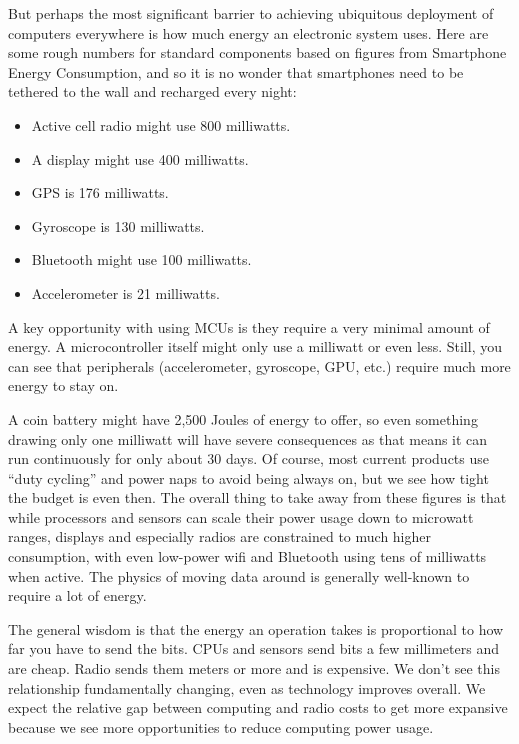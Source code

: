 But perhaps the most significant barrier to achieving ubiquitous deployment of computers everywhere is how much energy an electronic system uses. Here are some rough numbers for standard components based on figures from Smartphone Energy Consumption, and so it is no wonder that smartphones need to be tethered to the wall and recharged every night:

\begin{itemize}
    \item Active cell radio might use 800 milliwatts.
    \item A display might use 400 milliwatts.
    \item GPS is 176 milliwatts.
    \item Gyroscope is 130 milliwatts.
    \item Bluetooth might use 100 milliwatts.
    \item Accelerometer is 21 milliwatts.
\end{itemize}

A key opportunity with using MCUs is they require a very minimal amount of energy. A microcontroller itself might only use a milliwatt or even less. Still, you can see that peripherals (accelerometer, gyroscope, GPU, etc.) require much more energy to stay on.

A coin battery might have 2,500 Joules of energy to offer, so even something drawing only one milliwatt will have severe consequences as that means it can run continuously for only about 30 days. Of course, most current products use “duty cycling” and power naps to avoid being always on, but we see how tight the budget is even then. The overall thing to take away from these figures is that while processors and sensors can scale their power usage down to microwatt ranges, displays and especially radios are constrained to much higher consumption, with even low-power wifi and Bluetooth using tens of milliwatts when active. The physics of moving data around is generally well-known to require a lot of energy.

The general wisdom is that the energy an operation takes is proportional to how far you have to send the bits. CPUs and sensors send bits a few millimeters and are cheap. Radio sends them meters or more and is expensive. We don’t see this relationship fundamentally changing, even as technology improves overall. We expect the relative gap between computing and radio costs to get more expansive because we see more opportunities to reduce computing power usage.

